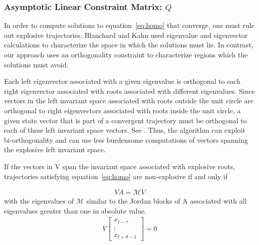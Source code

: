\documentclass[12pt]{article}
\begin{document}
\subsubsection{Asymptotic Linear Constraint Matrix: $Q$}
\label{asymQ}

\label{sec:invariantSpace}
In order to compute solutions to equation~\ref{eq:homo} that converge, 
one must rule out explosive trajectories. Blanchard and Kahn\cite{blanchard80} 
used eigenvalue and eigenvector calculations to characterize the space in 
which the solutions must lie. In contrast, our approach uses
an orthogonality constraint to characterize regions which the solutions 
must avoid.



Each left  eigenvector associated with a given eigenvalue
is orthogonal to each right eigenvector associated 
with roots associated with  different eigenvalues.
Since vectors in the left invariant space
associated with roots outside the unit circle are orthogonal to right eigenvectors associated with roots 
inside the
unit circle, a given state vector that is part of a convergent trajectory
must be orthogonal to each of these left invariant space vectors. See \cite{anderson10}.
Thus, the algorithm can exploit bi-orthogonality and can use
less burdensome computations of vectors spanning the explosive
left invariant space.




If the vectors in V span the invariant space associated with explosive
roots,  trajectories satisfying equation~\ref{eq:homo} 
are non-explosive if and only if

\begin{gather}
 V A =   \mathcal{M}  V 
\end{gather}
with the eigenvalues of $ \mathcal{M}$ similar to the 
Jordan blocks of A associated with all eigenvalues
greater than one in absolute value.
\begin{gather}
V 
\begin{bmatrix}
  x_{t-\tau}\\
\vdots\\
  x_{t+\theta-1}
\end{bmatrix}=0
\end{gather}
\end{document}
